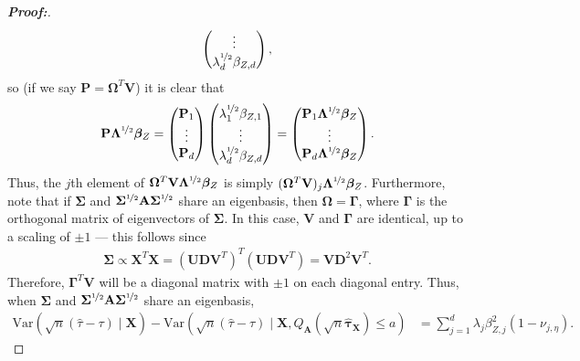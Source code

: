 \documentclass[11pt,twoside]{article}
\theoremstyle{definition}
\theoremstyle{remark}
\begin{document}
\begin{proof}[\textbf{Proof:}]
\begin{align*}
\begin{pmatrix}
        \vdots \\
       \lambda^{\nicefrac{1}{2}}_d \beta_{Z, d}
    \end{pmatrix},
\end{align*}
so (if we say $\mathbf{P} = \mathbf{\Omega}^T   \mathbf{V}$) it is clear that
\begin{align*}
    \mathbf{P}\mathbf{\Lambda}^{\nicefrac{1}{2}}  \bm{\beta}_Z = \begin{pmatrix}
        \mathbf{P}_1 \\
        \vdots \\
        \mathbf{P}_d
    \end{pmatrix} \begin{pmatrix}
        \lambda^{\nicefrac{1}{2}}_1 \beta_{Z, 1} \\
        \vdots \\
       \lambda^{\nicefrac{1}{2}}_d \beta_{Z, d}
    \end{pmatrix} = \begin{pmatrix}
        \mathbf{P}_1 \mathbf{\Lambda}^{\nicefrac{1}{2}} \bm{\beta}_Z \\
        \vdots \\
       \mathbf{P}_d \mathbf{\Lambda}^{\nicefrac{1}{2}} \bm{\beta}_Z 
    \end{pmatrix}.
\end{align*}
Thus, the $j$th element of $\mathbf{\Omega}^T   \mathbf{V} \mathbf{\Lambda}^{\nicefrac{1}{2}}  \bm{\beta}_Z$ is simply $(\mathbf{\Omega}^T   \mathbf{V})_j \mathbf{\Lambda}^{\nicefrac{1}{2}}  \bm{\beta}_Z$. Furthermore, note that if $\mathbf{\Sigma}$ and $\mathbf{\Sigma}^{\nicefrac{1}{2}} \mathbf{A} \mathbf{\Sigma}^{\nicefrac{1}{2}}$ share an eigenbasis, then $\mathbf{\Omega} = \mathbf{\Gamma}$, where $\mathbf{\Gamma}$ is the orthogonal matrix of eigenvectors of $\mathbf{\Sigma}$. In this case, $\mathbf{V}$ and $\mathbf{\Gamma}$ are identical, up to a scaling of $\pm 1$ --- this follows since
\begin{align*}
   \mathbf{\Sigma} \propto  \mathbf{X}^T \mathbf{X} = (\mathbf{U}\mathbf{D}\mathbf{V}^T)^T(\mathbf{U}\mathbf{D}\mathbf{V}^T) = \mathbf{V} \mathbf{D}^2 \mathbf{V}^T.
\end{align*}
Therefore, $\mathbf{\Gamma}^T \mathbf{V}$ will be a diagonal matrix with $\pm 1$ on each diagonal entry. Thus, when $\mathbf{\Sigma}$ and $\mathbf{\Sigma}^{\nicefrac{1}{2}} \mathbf{A} \mathbf{\Sigma}^{\nicefrac{1}{2}}$ share an eigenbasis,
\begin{align*}
    \text{Var}\left(\sqrt{n} \left(\widehat{\tau} - \tau \right) \mid \mathbf{X} \right) - \text{Var}\left(\sqrt{n} \left(\widehat{\tau} - \tau \right) \mid \mathbf{X}, Q_{\mathbf{A}}(\sqrt{n} \widehat{\bm{\tau}}_{\mathbf{X}}) \leq a \right) &= \sum^d_{j=1} \lambda_j \beta^2_{Z, j} (1 - \nu_{j, \eta}).

\end{align*}
\end{proof}
\end{document}
